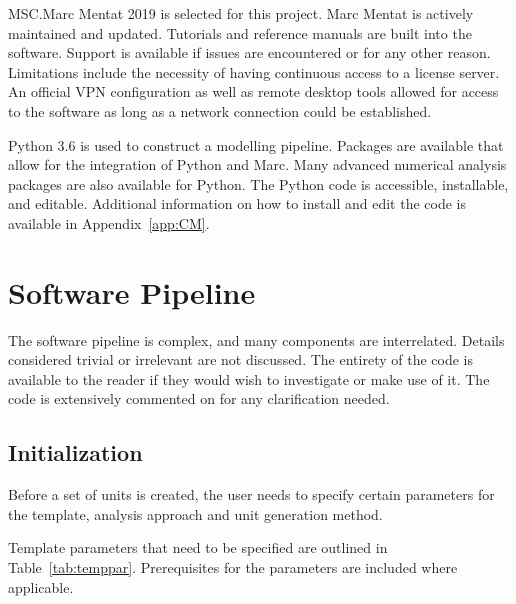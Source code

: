 MSC.Marc Mentat 2019 is selected for this project. Marc Mentat is actively maintained and updated. Tutorials and reference manuals are built into the software. Support is available if issues are encountered or for any other reason. Limitations include the necessity of having continuous access to a license server. An official VPN configuration as well as remote desktop tools allowed for access to the software as long as a network connection could be established.

Python 3.6 is used to construct a modelling pipeline. Packages are available that allow for the integration of Python and Marc. Many advanced numerical analysis packages are also available for Python. The Python code is accessible, installable, and editable. Additional information on how to install and edit the code is available in Appendix~\ref{app:CM}.

\section{Software Pipeline}
\label{sec:SW}

The software pipeline is complex, and many components are interrelated. Details considered trivial or irrelevant are not discussed. The entirety of the code is available to the reader if they would wish to investigate or make use of it. The code is extensively commented on for any clarification needed.

\subsection{Initialization}
\label{ssec:init}

Before a set of units is created, the user needs to specify certain parameters for the template, analysis approach and unit generation method.

Template parameters that need to be specified are outlined in Table~\ref{tab:temppar}. Prerequisites for the parameters are included where applicable.

